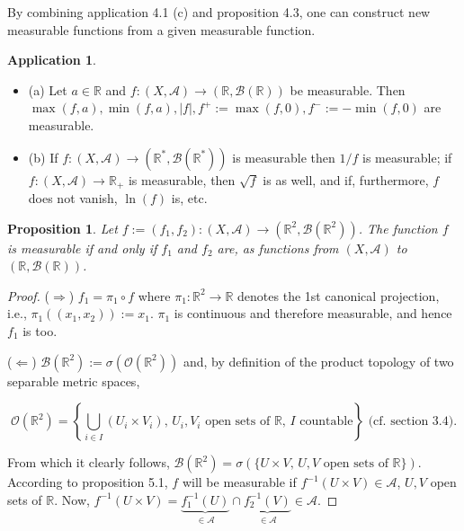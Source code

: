 \documentclass[11pt]{article}
\newtheorem{proposition}{Proposition}[section]
\theoremstyle{definition}
\newtheorem{application}{Application}[section]
\begin{document}
By combining application 4.1 (c) and proposition 4.3, one can construct new measurable functions from a given measurable function.

\begin{application}
    \begin{itemize}
    \item (a) Let $a \in \mathbb{R}$ and $f : (X, \mathscr{A}) \to (\mathbb{R}, \mathscr{B}(\mathbb{R}))$ be measurable. Then $\max(f, a), \min(f, a), |f|, f^+ := \max(f, 0), f^- := -\min(f, 0)$ are measurable.
    
    \item (b) If $f : (X, \mathscr{A}) \to (\mathbb{R}^*, \mathscr{B}(\mathbb{R}^*))$ is measurable then $1/f$ is measurable; if $f : (X, \mathscr{A}) \to \mathbb{R}_+$ is measurable, then $\sqrt{f}$ is as well, and if, furthermore, $f$ does not vanish, $\ln(f)$ is, etc.
\end{itemize}
\end{application}

\begin{proposition}
    Let $f := (f_1, f_2) : (X, \mathscr{A}) \to (\mathbb{R}^2, \mathscr{B}(\mathbb{R}^2))$. The function $f$ is measurable if and only if $f_1$ and $f_2$ are, as functions from $(X, \mathscr{A})$ to $(\mathbb{R}, \mathscr{B}(\mathbb{R}))$.
\end{proposition}
\begin{proof}
    ($\Rightarrow$) $f_1 = \pi_1 \circ f$ where $\pi_1 : \mathbb{R}^2 \to \mathbb{R}$ denotes the 1st canonical projection, i.e., $\pi_1((x_1, x_2)) := x_1$. $\pi_1$ is continuous and therefore measurable, and hence $f_1$ is too.

($\Leftarrow$) $\mathscr{B}(\mathbb{R}^2) := \sigma(\mathscr{O}(\mathbb{R}^2))$ and, by definition of the product topology of two separable metric spaces,

$$ \mathscr{O}(\mathbb{R}^2) = \left\{ \bigcup_{i \in I} (U_i \times V_i), \, U_i, V_i \text{ open sets of } \mathbb{R}, \, I \text{ countable} \right\} \text{ (cf. section 3.4).} $$

From which it clearly follows, $\mathscr{B}(\mathbb{R}^2) = \sigma(\{U \times V, \, U, V \text{ open sets of } \mathbb{R}\})$. According to proposition 5.1, $f$ will be measurable if $f^{-1}(U \times V) \in \mathscr{A}$, $U, V$ open sets of $\mathbb{R}$. Now, $f^{-1}(U \times V) = \underbrace{f_1^{-1}(U)}_{\in \mathscr{A}} \cap \underbrace{f_2^{-1}(V)}_{\in \mathscr{A}} \in \mathscr{A}$. 
\end{proof}
\end{document}
